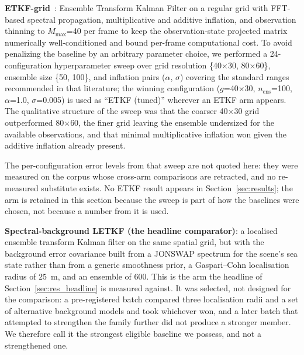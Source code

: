 \documentclass[review]{elsarticle}
\begin{document}
\textbf{ETKF-grid}~\citep{Wang2025PointsToWaves}: Ensemble Transform Kalman Filter
on a regular grid with FFT-based spectral propagation, multiplicative
and additive inflation, and observation thinning to $M_{\max}$=40 per frame to keep the
observation-state projected matrix numerically well-conditioned
and bound per-frame computational cost.  To avoid penalizing the baseline by an arbitrary parameter
choice, we performed a 24-configuration hyperparameter sweep over grid
resolution \{40$\times$30, 80$\times$60\}, ensemble size \{50, 100\},
and inflation pairs ($\alpha$, $\sigma$) covering the standard ranges
recommended in that literature; the winning configuration
($g$=40$\times$30, $n_{\text{ens}}$=100, $\alpha$=1.0, $\sigma$=0.005) is used as
``ETKF (tuned)'' wherever an ETKF arm appears. The qualitative structure of the
sweep was that the coarser 40$\times$30 grid outperformed 80$\times$60, the finer
grid leaving the ensemble undersized for the available observations, and that
minimal multiplicative inflation won given the additive inflation already
present.

The per-configuration error levels from that sweep are not quoted here: they were
measured on the corpus whose cross-arm comparisons are retracted, and no re-measured
substitute exists. No ETKF result appears in Section~\ref{sec:results}; the arm is
retained in this section because the sweep is part of how the baselines were chosen,
not because a number from it is used.

\textbf{Spectral-background LETKF (the headline comparator)}: a localised ensemble
transform Kalman filter on the same spatial grid, but with the background error
covariance built from a JONSWAP spectrum for the scene's sea state rather than from
a generic smoothness prior, a Gaspari--Cohn localisation radius of $25$~m, and an
ensemble of $600$. This is the arm the headline of Section~\ref{sec:res_headline}
is measured against. It was selected, not designed for the comparison: a
pre-registered batch compared three localisation radii and a set of alternative
background models and took whichever won, and a later batch that attempted to
strengthen the family further did not produce a stronger member. We therefore call
it the strongest eligible baseline we possess, and not a strengthened one.
\end{document}
